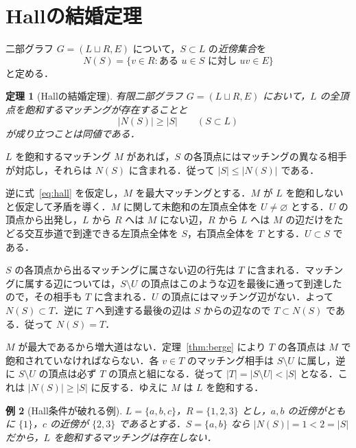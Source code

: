 \documentclass[a5paper,10pt,onecolumn]{jsarticle}
\makeatletter
\theoremstyle{mathnotetheorem}
\newtheorem{theorem}{定理}[section]
\newtheorem{example}[theorem]{例}
\renewcommand{\proofname}{証明}
\renewenvironment{proof}[1][\proofname]{%
  \par\pushQED{\qed}\normalfont\topsep4\p@\@plus2\p@\relax
  \trivlist\item[\hskip\labelsep\bfseries #1]\ignorespaces
}{\popQED\endtrivlist\@endpefalse}
\makeatother
\begin{document}
\section{Hallの結婚定理}
二部グラフ $G=(L\sqcup R,E)$ について，$S\subset L$ の\emph{近傍集合}を
\[
 N(S)=\{v\in R:\text{ある }u\in S\text{ に対し }uv\in E\}
\]
と定める．
\begin{theorem}[Hallの結婚定理]\label{thm:hall}
有限二部グラフ $G=(L\sqcup R,E)$ において，$L$ の全頂点を飽和するマッチングが存在することと
\[
 |N(S)|\ge |S|\qquad(S\subset L)
 \tag{1}\label{eq:hall}
\]
が成り立つことは同値である．
\end{theorem}
\begin{proof}
$L$ を飽和するマッチング $M$ があれば，$S$ の各頂点にはマッチングの異なる相手が対応し，それらは $N(S)$ に含まれる．従って $|S|\le|N(S)|$ である．

逆に式~\eqref{eq:hall} を仮定し，$M$ を最大マッチングとする．$M$ が $L$ を飽和しないと仮定して矛盾を導く．$M$ に関して未飽和の左頂点全体を $U\ne\varnothing$ とする．$U$ の頂点から出発し，$L$ から $R$ へは $M$ にない辺，$R$ から $L$ へは $M$ の辺だけをたどる交互歩道で到達できる左頂点全体を $S$，右頂点全体を $T$ とする．$U\subset S$ である．

$S$ の各頂点から出るマッチングに属さない辺の行先は $T$ に含まれる．マッチングに属する辺については，$S\setminus U$ の頂点はこのような辺を最後に通って到達したので，その相手も $T$ に含まれる．$U$ の頂点にはマッチング辺がない．よって $N(S)\subset T$．逆に $T$ へ到達する最後の辺は $S$ からの辺なので $T\subset N(S)$ である．従って $N(S)=T$．

$M$ が最大であるから増大道はない．定理~\ref{thm:berge} により $T$ の各頂点は $M$ で飽和されていなければならない．各 $v\in T$ のマッチング相手は $S\setminus U$ に属し，逆に $S\setminus U$ の頂点は必ず $T$ の頂点と組になる．従って $|T|=|S\setminus U|<|S|$ となる．これは $|N(S)|\ge|S|$ に反する．ゆえに $M$ は $L$ を飽和する．
\end{proof}

\begin{example}[Hall条件が破れる例]
$L=\{a,b,c\}$，$R=\{1,2,3\}$ とし，$a,b$ の近傍がともに $\{1\}$，$c$ の近傍が $\{2,3\}$ であるとする．$S=\{a,b\}$ なら $|N(S)|=1<2=|S|$ だから，$L$ を飽和するマッチングは存在しない．
\end{example}
\end{document}
